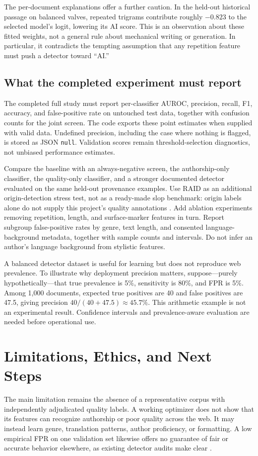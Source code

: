 \documentclass[11pt]{article}
\begin{document}
The per-document explanations offer a further caution. In the held-out
historical passage on balanced valves, repeated trigrams contribute roughly
$-0.823$ to the selected model's logit, lowering its AI score. This is an
observation about these fitted weights, not a general rule about mechanical
writing or generation. In particular, it contradicts the tempting assumption
that any repetition feature must push a detector toward ``AI.''

\subsection{What the completed experiment must report}
The completed full study must report per-classifier AUROC, precision, recall,
F1, accuracy, and false-positive rate on untouched test data, together with
confusion counts for the joint screen. The code exports these point estimates
when supplied with valid data. Undefined precision, including the case where
nothing is flagged, is stored as JSON \texttt{null}. Validation scores remain
threshold-selection diagnostics, not unbiased performance estimates.

Compare the baseline with an always-negative screen, the authorship-only
classifier, the quality-only classifier, and a stronger documented detector
evaluated on the same held-out provenance examples. Use RAID as an additional
origin-detection stress test, not as a ready-made slop benchmark: origin labels
alone do not supply this project's quality annotations \cite{raid}. Add
ablation experiments removing repetition, length, and surface-marker features
in turn. Report subgroup false-positive rates by genre, text length, and
consented language-background metadata, together with sample counts and
intervals. Do not infer an author's language background from stylistic features.

A balanced detector dataset is useful for learning but does not reproduce web
prevalence. To illustrate why deployment precision matters, suppose---purely
hypothetically---that true prevalence is 5\%, sensitivity is 80\%, and FPR is
5\%. Among 1,000 documents, expected true positives are 40 and false positives
are 47.5, giving precision $40/(40+47.5)\approx45.7\%$. This arithmetic example
is not an experimental result. Confidence intervals and prevalence-aware
evaluation are needed before operational use.



\section{Limitations, Ethics, and Next Steps}
The main limitation remains the absence of a representative corpus with
independently adjudicated quality labels. A working optimizer does not show
that its features can recognize authorship or poor quality across the web.
It may instead learn genre, translation patterns, author proficiency, or
formatting. A low empirical FPR on one validation set likewise offers no
guarantee of fair or accurate behavior elsewhere, as existing detector audits
make clear \cite{liang,tufts}.
\end{document}
